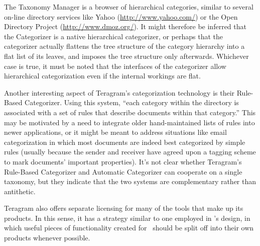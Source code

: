 The Taxonomy Manager is a browser of hierarchical categories, similar
to several on-line directory services like Yahoo
(\url{http://www.yahoo.com/}) or the Open Directory Project
(\url{http://www.dmoz.org/}).  It might therefore be inferred that the
Categorizer is a native hierarchical categorizer, or perhaps that the
categorizer actually flattens the tree structure of the category
hierarchy into a flat list of its leaves, and imposes the tree
structure only afterwards.  Whichever case is true, it must be noted
that the interfaces of the categorizer allow hierarchical
categorization even if the internal workings are flat.

Another interesting aspect of Teragram's categorization technology is
their Rule-Based Categorizer.  Using this system, ``each category
within the directory is associated with a set of rules that describe
documents within that category.''  This may be motivated by a need to
integrate older hand-maintained lists of rules into newer
applications, or it might be meant to address situations like email
categorization in which most documents are indeed best categorized by
simple rules (usually because the sender and receiver have agreed upon
a tagging scheme to mark documents' important properties).  It's not
clear whether Teragram's Rule-Based Categorizer and Automatic
Categorizer can cooperate on a single taxonomy, but they indicate that
the two systems are complementary rather than antithetic.

Teragram also offers separate licensing for many of the tools that
make up its products.  In this sense, it has a strategy similar to one
employed in \aicat's design, in which useful pieces of
functionality created for \aicat\ should be split off into
their own products whenever possible.

